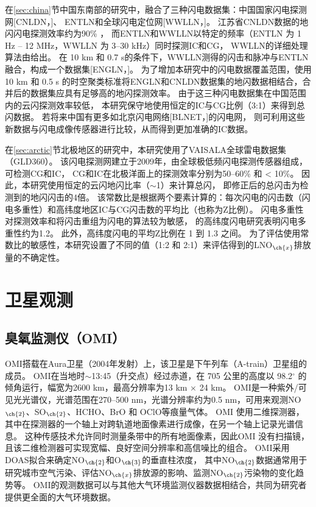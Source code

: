 在\ref{sec:china}节中国东南部的研究中，融合了三种闪电数据集：中国国家闪电探测网[CNLDN，\citet{Yang.2015}]、
ENTLN和全球闪电定位网[WWLLN，\citet{Rodger.2006}]。
江苏省CNLDN数据的地闪闪电探测效率约为90\% \citep{Li.2017a}，
而ENTLN和WWLLN以特定的频率（ENTLN 为 1 Hz -- 12 MHz，WWLLN 为 3--30 kHz）同时探测IC和CG，
WWLLN的详细处理算法由\citet{Rodger.2004}给出。
在 10 km 和 0.7 s的条件下，WWLLN测得的闪击和脉冲与ENTLN融合，构成一个数据集[ENGLN，\citet{Virts.2020b}]。
为了增加本研究中的闪电数据覆盖范围，使用 10 km 和 0.5 s 的时空聚类标准将ENGLN和CNLDN数据集的地闪数据相结合\citep{Zhao.2020}，合并后的数据集应具有足够高的地闪探测效率。
由于这三种闪电数据集在中国范围内的云闪探测效率较低，
本研究保守地使用恒定的IC与CG比例（3:1）来得到总闪数据\citep{Wu.2016,Bandholnopparat.2020}。
若将来中国有更多如北京闪电网络[BLNET，\citet{Srivastava.2017}]的闪电网，
则可利用这些新数据与闪电成像传感器进行比较\citep{Rudlosky.2013,Poelman.2020}，从而得到更加准确的IC数据。

在\ref{sec:arctic}节北极地区的研究中，本研究使用了VAISALA全球雷电数据集（GLD360）。
该闪电探测网建立于2009年，由全球极低频闪电探测传感器组成，可检测CG和IC\citep{Said.2010,Said.2013,Said.2017}，
CG和IC在北极洋面上的探测效率分别为50--60\% 和 < 10\%\citep{Vagasky.2022}。
因此，本研究使用恒定的云闪地闪比率（$\sim$1）来计算总闪，
即修正后的总闪击为检测到的地闪闪击的4倍\citep{Mackerras.1994,Prentice.1977}。
该常数比是根据两个要素计算的：每次闪电的闪击数（闪电多重性）和高纬度地区IC与CG闪击数的平均比（也称为Z比例）。
闪电多重性对探测效率和将闪击重组为闪电的算法较为敏感\citep{Schulz.2005,Yair.2014,Burgesser.2017,Kolmasova.2022}，
\citet{Yusop.2019}的高纬度闪电研究表明闪电多重性约为1.2。
此外，高纬度闪电的平均Z比例在 1 到 1.3 之间\citep{Mackerras.1994,Prentice.1977,Bandholnopparat.2020}。
为了评估使用常数比的敏感性，本研究设置了不同的值（1:2 和 2:1）来评估得到的LNO$_{\ch{x}}$排放量的不确定性。


\section{卫星观测}

\subsection{臭氧监测仪（OMI）}

OMI搭载在Aura卫星（2004年发射）上，该卫星是下午列车（A-train）卫星组的成员\citep{Levelt.2006,Levelt.2018}。
OMI在当地时$\sim$13:45（升交点）经过赤道，在 705 公里的高度以 98.2$^{\circ}$ 的倾角运行，幅宽为2600 km，最高分辨率为13 km $\times$ 24 km。
OMI是一种紫外/可见光光谱仪，光谱范围在270--500 nm，光谱分辨率约为0.5 nm，可用来观测NO$_{\ch{2}}$、SO$_{\ch{2}}$、HCHO、BrO 和 OClO等痕量气体。
OMI 使用二维探测器，其中在探测器的一个轴上对跨轨道地面像素进行成像，在另一个轴上记录光谱信息。 这种传感技术允许同时测量条带中的所有地面像素，因此OMI 没有扫描镜，且该二维检测器可实现宽幅、良好空间分辨率和高信噪比的组合。
OMI采用DOAS拟合来确定NO$_{\ch{2}}$和O$_{\ch{3}}$的垂直柱浓度，
其中NO$_{\ch{2}}$数据通常用于研究城市空气污染、评估NO$_{\ch{x}}$排放源的影响、监测NO$_{\ch{2}}$污染物的变化趋势等。
OMI的观测数据可以与其他大气环境监测仪器数据相结合，共同为研究者提供更全面的大气环境数据。

